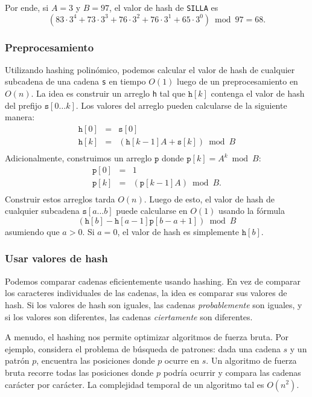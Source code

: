 Por ende, si $A=3$ y $B=97$, el valor de hash de \texttt{SILLA} es
\[(83 \cdot 3^4 + 73 \cdot 3^3 + 76 \cdot 3^2 + 76 \cdot 3^1 + 65 \cdot 3^0) \bmod 97 = 68.\]

\subsubsection*{Preprocesamiento}

Utilizando hashing polinómico, podemos calcular el valor de hash de
cualquier subcadena de una cadena \texttt{s} en tiempo $O(1)$ luego de un
preprocesamiento en $O(n)$. La idea es construir un arreglo \texttt{h} tal
que $\texttt{h}[k]$ contenga el valor de hash del prefijo
$\texttt{s}[0 \ldots k]$. Los valores del arreglo pueden calcularse de la
siguiente manera:
\[
    \begin{array}{lcl}
        \texttt{h}[0] & = & \texttt{s}[0]                               \\
        \texttt{h}[k] & = & (\texttt{h}[k-1] A + \texttt{s}[k]) \bmod B \\
    \end{array}
\]
Adicionalmente, construimos un arreglo $\texttt{p}$ donde
$\texttt{p}[k]=A^k \bmod B$:
\[
    \begin{array}{lcl}
        \texttt{p}[0] & = & 1                            \\
        \texttt{p}[k] & = & (\texttt{p}[k-1] A) \bmod B. \\
    \end{array}
\]
Construir estos arreglos tarda $O(n)$. Luego de esto, el valor de hash
de cualquier subcadena $\texttt{s}[a \ldots b]$ puede calcularse en
$O(1)$ usando la fórmula
\[(\texttt{h}[b]-\texttt{h}[a-1] \texttt{p}[b-a+1]) \bmod B\]
asumiendo que $a>0$. Si $a=0$, el valor de hash es simplemente
$\texttt{h}[b]$.

\subsubsection*{Usar valores de hash}

Podemos comparar cadenas eficientemente usando hashing. En vez
de comparar los caracteres individuales de las cadenas, la idea es comparar
sus valores de hash. Si los valores de hash son iguales, las cadenas
\emph{probablemente} son iguales, y si los valores son diferentes, las
cadenas \emph{ciertamente} son diferentes.

A menudo, el hashing nos permite optimizar algoritmos de fuerza bruta.
Por ejemplo, considera el problema de búsqueda de patrones: dada una cadena
$s$ y un patrón $p$, encuentra las posiciones donde $p$ ocurre en $s$.
Un algoritmo de fuerza bruta recorre todas las posiciones donde $p$
podría ocurrir y compara las cadenas carácter por carácter. La complejidad
temporal de un algoritmo tal es $O(n^2)$.

